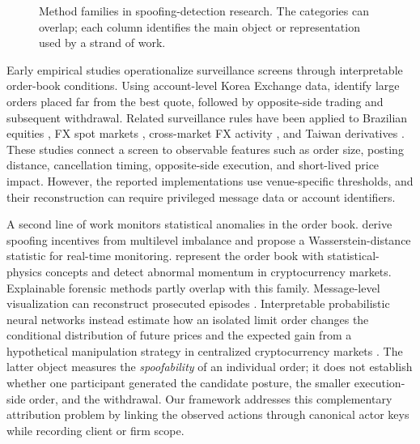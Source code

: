 \documentclass[11pt]{article}
\begin{document}
\begin{figure}[htbp]
    \caption{Method families in spoofing-detection research. The categories can overlap; each column identifies
    the main object or representation used by a strand of work.}
    \label{fig:method_taxonomy}
\end{figure}

Early empirical studies operationalize surveillance screens through interpretable order-book conditions. Using account-level
Korea Exchange data, \cite{LeeEomPark2013} identify large orders placed far from the best quote, followed by opposite-side trading and
subsequent withdrawal. Related surveillance rules have been applied to Brazilian equities
\cite{MendoncaDeGenaro2020}, FX spot markets \cite{StenforsSusai2021}, cross-market FX activity
\cite{StenforsEtAl2023}, and Taiwan derivatives \cite{ChenHsiehYang2026}. These studies connect a screen to observable
features such as order size, posting distance, cancellation timing, opposite-side execution, and short-lived price
impact. However, the reported implementations use venue-specific thresholds, and their reconstruction can require
privileged message data or account identifiers.

A second line of work monitors statistical anomalies in the order book. \cite{TaoDayLingDrapeau2022} derive spoofing
incentives from multilevel imbalance and propose a Wasserstein-distance statistic for real-time monitoring.
\cite{LiPolukarovaVentre2023} represent the order book with statistical-physics concepts and detect abnormal momentum in
cryptocurrency markets. Explainable forensic methods partly overlap with this family. Message-level visualization can
reconstruct prosecuted episodes \cite{DebieEtAl2023}. Interpretable probabilistic neural networks instead estimate how an
isolated limit order changes the conditional distribution of future prices and the expected gain from a hypothetical
manipulation strategy in centralized cryptocurrency markets \cite{FabreChallet2025}. The latter object measures
the \emph{spoofability} of an individual order; it does not establish whether one participant generated the candidate posture,
the smaller execution-side order, and the withdrawal. Our framework addresses this complementary attribution problem by
linking the observed actions through canonical actor keys while recording client or firm scope.
\end{document}
